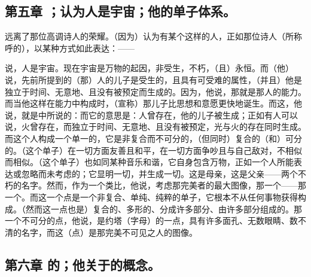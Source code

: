 
\subsection{第五章 ；认为人是宇宙；他的单子体系。}

远离了那位高调诗人的荣耀。（因为）认为有某个这样的人，正如那位诗人（所称呼的），以某种方式如此表达：——\par

\par

说，人是宇宙。现在宇宙是万物的起因，非受生，不朽，（且）永恒。而（他）说，先前所提到的（那）人的儿子是受生的，且具有可受难的属性，（并且）他是独立于时间、无意地、且没有被预定而生成的。因为，他说，那就是那人的能力。而当他这样在能力中构成时，（宣称）那儿子比思想和意愿更快地诞生。而这，他说，就是中所说的：而它的意思是：人曾存在，他的儿子被生成；正如有人可以说，火曾存在，而独立于时间、无意地、且没有被预定，光与火的存在同时生成。而这个人构成一个单一的，它是非复合而不可分的，（但同时）复合的（和）可分的。（这个单子）在一切方面友善且和平，在一切方面争吵且与自己敌对，不相似而相似。（这个单子）也如同某种音乐和谐，它自身包含万物，正如一个人所能表达或忽略而未考虑的；它显明一切，并生成一切。这是母亲，这是父亲——两个不朽的名字。然而，作为一个类比，他说，考虑那完美者的最大图像，那一个——那一个。而这一个点是一个非复合、单纯、纯粹的单子，它根本不从任何事物获得构成。（然而这一点也是）复合的、多形的、分成许多部分、由许多部分组成的。那一个不可分的点，他说，是约塔（字母）的一点，具有许多面孔、无数眼睛、数不清的名字，而这（点）是那完美不可见之人的图像。\par


\subsection{第六章 的；他关于的概念。}

